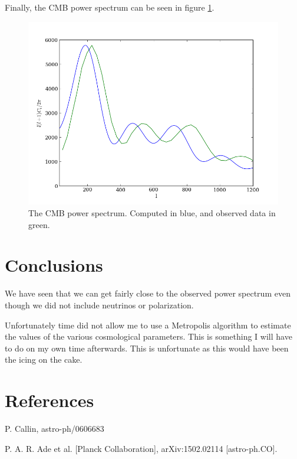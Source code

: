 \documentclass[a4paper]{report}
\begin{document}
Finally, the CMB power spectrum can be seen in figure \ref{fig:Cl}.
\begin{figure}[ht]
 \includegraphics[width=\textwidth]{Cl.png}
 \caption{The CMB power spectrum. Computed in blue, and observed data in green.}
 \label{fig:Cl}
\end{figure}


\section{Conclusions}\label{sec:Conc}
We have seen that we can get fairly close to the observed power spectrum even though we did not include neutrinos or polarization. 


Unfortunately time did not allow me to use a Metropolis algorithm to estimate the values of the various cosmological parameters. This is something I will have to do on my own time afterwards. This is unfortunate as this would have been the icing on the cake.


\section{References}
\begin{enumerate}[label= {[}\arabic*{]} ]
 \item P. Callin, astro-ph/0606683
 \item P. A. R. Ade et al. [Planck Collaboration], arXiv:1502.02114 [astro-ph.CO].
 
\end{enumerate}
\end{document}
